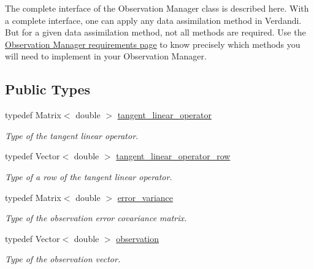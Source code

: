 \documentclass{tufte-book}
\begin{document}
The complete interface of the Observation Manager class is described here. With a complete interface, one can apply any data assimilation method in Verdandi. But for a given data assimilation method, not all methods are required. Use the \hyperlink{observation_requirement_page}{\-Observation Manager requirements page} to know precisely which methods you will need to implement in your Observation Manager.


\subsection{\-Public \-Types}
\begin{DoxyCompactItemize}
\item
\hypertarget{class_verdandi_1_1_observation_manager_template_a01c360118f7c08c34de9cf1a406e4405}{
typedef \-Matrix$<$ double $>$ \hyperlink{class_verdandi_1_1_observation_manager_template_a01c360118f7c08c34de9cf1a406e4405}{tangent\-\_\-linear\-\_\-operator}}
\label{class_verdandi_1_1_observation_manager_template_a01c360118f7c08c34de9cf1a406e4405}

\begin{DoxyCompactList}\small\item\em \-Type of the tangent linear operator. \end{DoxyCompactList}\item
\hypertarget{class_verdandi_1_1_observation_manager_template_a596a76a0e00b412f0b7cda4c7fb9d8f1}{
typedef \-Vector$<$ double $>$ \hyperlink{class_verdandi_1_1_observation_manager_template_a596a76a0e00b412f0b7cda4c7fb9d8f1}{tangent\-\_\-linear\-\_\-operator\-\_\-row}}
\label{class_verdandi_1_1_observation_manager_template_a596a76a0e00b412f0b7cda4c7fb9d8f1}

\begin{DoxyCompactList}\small\item\em \-Type of a row of the tangent linear operator. \end{DoxyCompactList}\item
\hypertarget{class_verdandi_1_1_observation_manager_template_a6c945c41f11fb91cf83a2535b7516cc2}{
typedef \-Matrix$<$ double $>$ \hyperlink{class_verdandi_1_1_observation_manager_template_a6c945c41f11fb91cf83a2535b7516cc2}{error\-\_\-variance}}
\label{class_verdandi_1_1_observation_manager_template_a6c945c41f11fb91cf83a2535b7516cc2}

\begin{DoxyCompactList}\small\item\em \-Type of the observation error covariance matrix. \end{DoxyCompactList}\item
\hypertarget{class_verdandi_1_1_observation_manager_template_ae5afff62ea0f6f0926e80467c6d14ec6}{
typedef \-Vector$<$ double $>$ \hyperlink{class_verdandi_1_1_observation_manager_template_ae5afff62ea0f6f0926e80467c6d14ec6}{observation}}
\label{class_verdandi_1_1_observation_manager_template_ae5afff62ea0f6f0926e80467c6d14ec6}

\begin{DoxyCompactList}\small\item\em \-Type of the observation vector. \end{DoxyCompactList}\end{DoxyCompactItemize}
\end{document}
